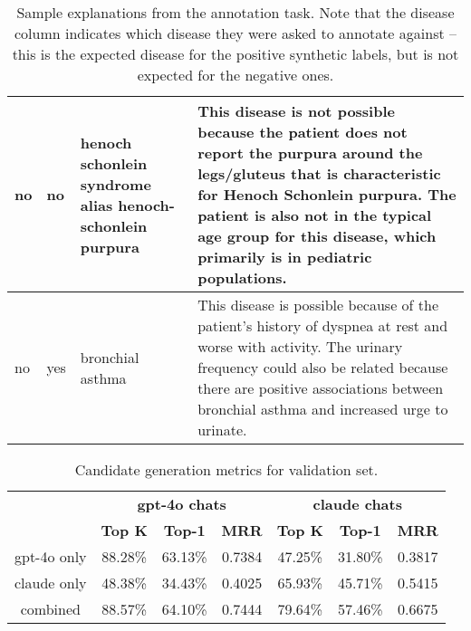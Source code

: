 \begin{table*}
\begin{tabular}{p{} p{} p{} p{}}
    no & no & henoch schonlein syndrome alias henoch-schonlein purpura & This disease is not possible because the patient does not report the purpura around the legs/gluteus that is characteristic for Henoch Schonlein purpura. The patient is also not in the typical age group for this disease, which primarily is in pediatric populations. \\     \midrule
    no & yes & bronchial asthma & This disease is possible because of the patient's history of dyspnea at rest and worse with activity. The urinary frequency could also be related because there are positive associations between bronchial asthma and increased urge to urinate. \\     
    \bottomrule
\end{tabular}
\caption{Sample explanations from the annotation task. Note that the disease column indicates which disease they were asked to annotate against -- this is the expected disease for the positive synthetic labels, but is not expected for the negative ones.}
\label{tab:ann_reasoning}
\end{table*}

\begin{table*}
    \centering
    \begin{tabular}{c | c c c | c c c}
        \toprule
        & \multicolumn{3}{c|}{\textbf{gpt-4o chats}} & \multicolumn{3}{c}{\textbf{claude chats}} \\
        \cmidrule(lr){2-4} \cmidrule(lr){5-7}
        & \textbf{Top K} & \textbf{Top-1} & \textbf{MRR} & \textbf{Top K} & \textbf{Top-1} & \textbf{MRR} \\ 
        \midrule
        gpt-4o only & 88.28\% & 63.13\% & 0.7384 & 47.25\% & 31.80\% & 0.3817 \\ 
        claude only & 48.38\% & 34.43\% & 0.4025 & 65.93\% & 45.71\% & 0.5415 \\ 
        combined & 88.57\% & 64.10\% & 0.7444 & 79.64\% & 57.46\% & 0.6675 \\ 
        \bottomrule
    \end{tabular}
    \caption{Candidate generation metrics for validation set.}
    \label{tab:validation_performance}
\end{table*}




